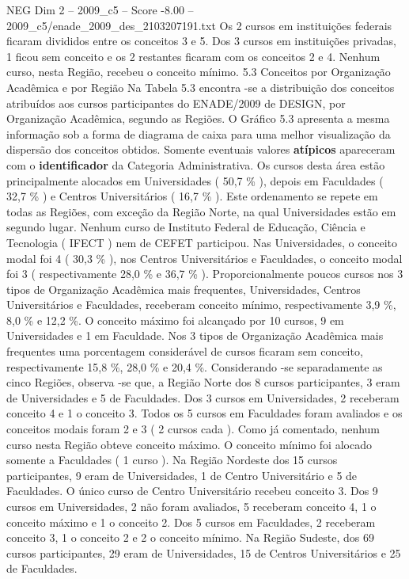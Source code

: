 \begin{textsample}{NEG Dim 2 – 2009\_c5 – Score -8.00 – 2009\_c5/enade\_2009\_des\_2103207191.txt}
Os 2 cursos em instituições federais ficaram divididos entre os conceitos 3 e 5.
Dos 3 cursos em instituições privadas, 1 ficou sem conceito e os 2 restantes ficaram com os conceitos 2 e 4.
Nenhum curso, nesta Região, recebeu o conceito mínimo. 5.3 Conceitos por Organização Acadêmica e por Região Na Tabela 5.3 encontra -se a distribuição dos conceitos atribuídos aos cursos participantes do ENADE/2009 de DESIGN, por Organização Acadêmica, segundo as Regiões.
O Gráfico 5.3 apresenta a mesma informação sob a forma de diagrama de caixa para uma melhor visualização da dispersão dos conceitos obtidos.
Somente eventuais valores \textbf{atípicos} apareceram com o \textbf{identificador} da Categoria Administrativa.
Os cursos desta área estão principalmente alocados em Universidades ( 50,7 \% ), depois em Faculdades ( 32,7 \% ) e Centros Universitários ( 16,7 \% ).
Este ordenamento se repete em todas as Regiões, com exceção da Região Norte, na qual Universidades estão em segundo lugar.
Nenhum curso de Instituto Federal de Educação, Ciência e Tecnologia ( IFECT ) nem de CEFET participou.
Nas Universidades, o conceito modal foi 4 ( 30,3 \% ), nos Centros Universitários e Faculdades, o conceito modal foi 3 ( respectivamente 28,0 \% e 36,7 \% ).
Proporcionalmente poucos cursos nos 3 tipos de Organização Acadêmica mais frequentes, Universidades, Centros Universitários e Faculdades, receberam conceito mínimo, respectivamente 3,9 \%, 8,0 \% e 12,2 \%.
O conceito máximo foi alcançado por 10 cursos, 9 em Universidades e 1 em Faculdade.
Nos 3 tipos de Organização Acadêmica mais frequentes uma porcentagem considerável de cursos ficaram sem conceito, respectivamente 15,8 \%, 28,0 \% e 20,4 \%.
Considerando -se separadamente as cinco Regiões, observa -se que, a Região Norte dos 8 cursos participantes, 3 eram de Universidades e 5 de Faculdades.
Dos 3 cursos em Universidades, 2 receberam conceito 4 e 1 o conceito 3.
Todos os 5 cursos em Faculdades foram avaliados e os conceitos modais foram 2 e 3 ( 2 cursos cada ).
Como já comentado, nenhum curso nesta Região obteve conceito máximo.
O conceito mínimo foi alocado somente a Faculdades ( 1 curso ).
Na Região Nordeste dos 15 cursos participantes, 9 eram de Universidades, 1 de Centro Universitário e 5 de Faculdades.
O único curso de Centro Universitário recebeu conceito 3.
Dos 9 cursos em Universidades, 2 não foram avaliados, 5 receberam conceito 4, 1 o conceito máximo e 1 o conceito 2.
Dos 5 cursos em Faculdades, 2 receberam conceito 3, 1 o conceito 2 e 2 o conceito mínimo.
Na Região Sudeste, dos 69 cursos participantes, 29 eram de Universidades, 15 de Centros Universitários e 25 de Faculdades.

\end{textsample}
